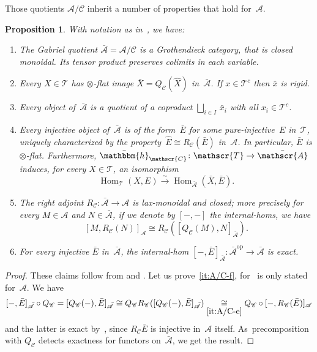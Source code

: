\documentclass[JEP,XML,SOM,Unicode]{cedram}
\newenvironment{enumeratea}
{\bgroup\def\theenumi{\alph{enumi}}\begin{enumerate}}
{\end{enumerate}\egroup}
\numberwithin{equation}{section}
\newtheorem{Prop}[equation]{Proposition}
\theoremstyle{definition}
\DeclareMathOperator{\Hom}{Hom}
\DeclareMathOperator{\opname}{op}
\newcommand{\cat}[1]{\mathscr{#1}}
\newcommand{\Homcat}[1]{\Hom_{\cat #1}}
\newcommand{\isoto}{\overset{\sim}{\longrightarrow}}
\newcommand{\op}{^{\opname}}
\newcommand{\bat}[1]{\bar{\cat{#1}}}
\newcommand{\boneda}{\bar\yoneda}
\newcommand{\cA}{\cat{A}}
\newcommand{\cC}{\cat{C}}
\newcommand{\cT}{\cat{T}}
\newcommand{\yoneda}{\mathbbm{h}}
\begin{document}
Those quotients $\cA/\cC$ inherit a number of properties that hold for~$\cA$.
\begin{Prop}
\label{Prop:A/C}
With notation as in~, we have:
\begin{enumeratea}
\item
\label{it:A/C-a}
The Gabriel quotient $\bat{A}=\cA/\cC$ is a Grothendieck category, that is closed monoidal. Its tensor product preserves colimits in each variable.
\item
\label{it:A/C-b}
Every $X\in\cT$ has $\otimes$-flat image $\bar X=Q_\cC(\hat X)$ in~$\bat{A}$. If $x\in \cT^c$ then $\bar x$ is rigid.
\item
\label{it:A/C-c}
Every object of~$\bat{A}$ is a quotient of a coproduct $\bigsqcup_{i\in I}\,\bar x_i$ with all $x_i\in \cT^c$.

\item
\label{it:A/C-d}
Every injective object of~$\bat{A}$ is of the form~$\bar E$ for some pure-injective~$E$ in~$\cT$, uniquely characterized by the property~$\hat E\cong R_\cC(\bar E)$ in~$\cA$. In particular, $\bar E$ is $\otimes$-flat. Furthermore, $\boneda_\cC\colon \cT\to \bat{A}$ induces, for every $X\in\cT$, an isomorphism
\[
\Homcat{T}(X,E)\isoto \Homcat{{\bat{A}}}(\bar X,\bar E).
\]
\item
\label{it:A/C-e}
The right adjoint $R_\cC\colon \bat{A}\to \cat{A}$ is lax-monoidal and closed; more precisely for every $M\in\cA$ and $N\in\bat{A}$, if we denote by $[-,-]$ the internal-homs, we have
\[
[M,R_\cC(N)]_{\cA}\cong R_{\cC}([Q_\cC(M),N]_{\bat{A}}).
\]
\item
\label{it:A/C-f}
For every injective $\bar E$ in~$\bat{A}$, the internal-hom $[-,\bar E]_{\bat{A}}\colon \bat{A}\op\to \bat{A}$ is exact.
\end{enumeratea}
\end{Prop}

\begin{proof}
These claims follow from \cite[App.\,A]{BalmerKrauseStevenson20} and \cite[\S2\,\&\,App.\,A]{BalmerKrauseStevenson19}. Let us prove~\eqref{it:A/C-f}, for~\cite[Lem.\,2.8]{BalmerKrauseStevenson19} is only stated for~$\cA$. We have
\[
[-,\bar E]_{\bat{A}}\circ Q_{\cC}=[Q_{\cC}(-),\bar E]_{\bat{A}}\cong Q_{\cC}R_{\cC}([Q_\cC(-),\bar E]_{\bat{A}})\underset{\eqref{it:A/C-e}}{\cong} Q_{\cC}\circ[-,R_\cC(\bar E)]_{\cat{A}}
\]
and the latter is exact by~\cite[Lem.\,2.8]{BalmerKrauseStevenson19}, since $R_\cC\bar E$ is injective in~$\cA$ itself. As~pre\-composition with $Q_\cC$ detects exactness for functors on~$\bat{A}$, we get the result.
\end{proof}
\end{document}
